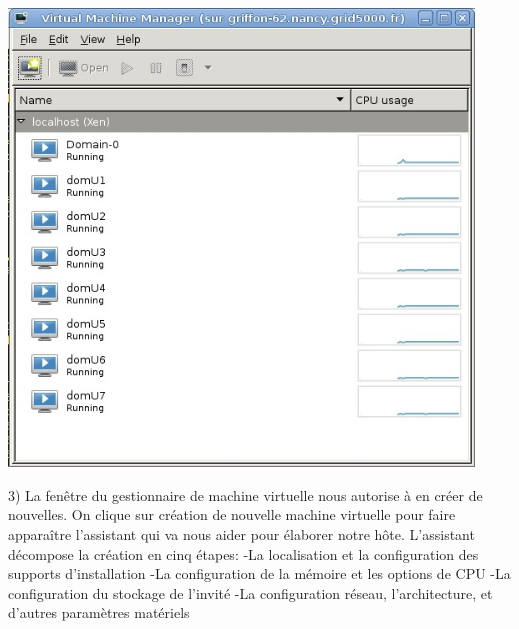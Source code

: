 \begin{center}
\includegraphics[width=350pt]{images/virt.jpg}
\end{center}

3) La fenêtre du gestionnaire de machine virtuelle nous autorise à en créer de nouvelles.
On clique sur création de nouvelle machine virtuelle pour faire apparaître l'assistant qui va nous aider pour élaborer notre hôte.
L'assistant décompose la création en cinq étapes:
-La localisation et la configuration des supports d'installation
-La configuration de la mémoire et les options de CPU
-La configuration du stockage de l'invité
-La configuration réseau, l'architecture, et d'autres paramètres matériels

